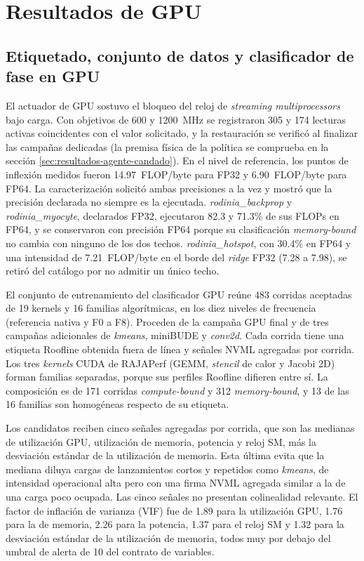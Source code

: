 \section{Resultados de GPU}
\label{sec:resultados-gpu}

\subsection{Etiquetado, conjunto de datos y clasificador de fase en GPU}
\label{sec:resultados-gpu-dvfs}
\label{sec:resultados-precision-gpu}

El actuador de GPU sostuvo el bloqueo del reloj de \textit{streaming multiprocessors} bajo carga. Con objetivos de 600 y 1200~MHz se registraron 305 y 174 lecturas activas coincidentes con el valor solicitado, y la restauración se verificó al finalizar las campañas dedicadas (la premisa física de la política se comprueba en la sección \ref{sec:resultados-agente-candado}). En el nivel de referencia, los puntos de inflexión medidos fueron 14.97~FLOP/byte para FP32 y 6.90~FLOP/byte para FP64. La caracterización solicitó ambas precisiones a la vez y mostró que la precisión declarada no siempre es la ejecutada. \textit{rodinia\_backprop} y \textit{rodinia\_myocyte}, declarados FP32, ejecutaron 82.3 y 71.3\% de sus FLOPs en FP64, y se conservaron con precisión FP64 porque su clasificación \textit{memory-bound} no cambia con ninguno de los dos techos. \textit{rodinia\_hotspot}, con 30.4\% en FP64 y una intensidad de 7.21~FLOP/byte en el borde del \textit{ridge} FP32 (7.28 a 7.98), se retiró del catálogo por no admitir un único techo.

\label{sec:resultados-gpu-dataset-final}El conjunto de entrenamiento del clasificador GPU reúne 483 corridas aceptadas de 19 kernels y 16 familias algorítmicas, en los diez niveles de frecuencia (referencia nativa y F0 a F8). Proceden de la campaña GPU final y de tres campañas adicionales de \textit{kmeans}, miniBUDE y \textit{conv2d}. Cada corrida tiene una etiqueta Roofline obtenida fuera de línea y señales NVML agregadas por corrida. Los tres \textit{kernels} CUDA de RAJAPerf \cite{Beckingsale2019} (GEMM, \textit{stencil} de calor y Jacobi 2D) forman familias separadas, porque sus perfiles Roofline difieren entre sí. La composición es de 171 corridas \textit{compute-bound} y 312 \textit{memory-bound}, y 13 de las 16 familias son homogéneas respecto de su etiqueta.

Los candidatos reciben cinco señales agregadas por corrida, que son las medianas de utilización GPU, utilización de memoria, potencia y reloj SM, más la desviación estándar de la utilización de memoria. Esta última evita que la mediana diluya cargas de lanzamientos cortos y repetidos como \textit{kmeans}, de intensidad operacional alta pero con una firma NVML agregada similar a la de una carga poco ocupada. Las cinco señales no presentan colinealidad relevante. El factor de inflación de varianza (VIF) fue de 1.89 para la utilización GPU, 1.76 para la de memoria, 2.26 para la potencia, 1.37 para el reloj SM y 1.32 para la desviación estándar de la utilización de memoria, todos muy por debajo del umbral de alerta de 10 del contrato de variables.

